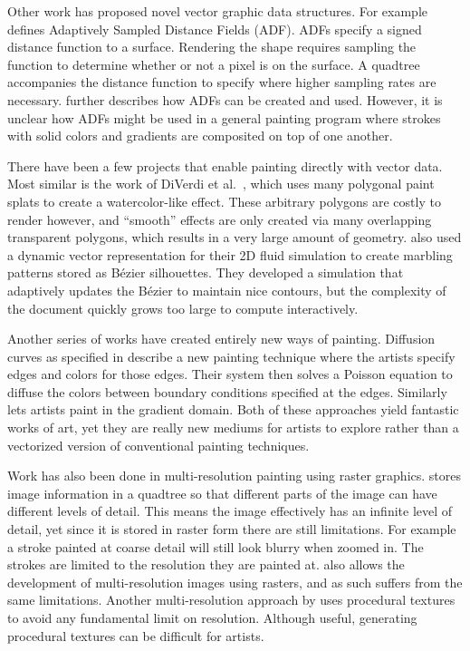 \documentclass[review]{acmsiggraph}
\begin{document}
Other work has proposed novel vector graphic data structures. For example \cite{Frisken:2000:ASD:344779.344899}
defines Adaptively Sampled Distance Fields (ADF). ADFs specify a signed distance function to a surface.
Rendering the shape requires sampling the function to determine whether or not a pixel is on the surface.
A quadtree accompanies the distance function to specify where higher sampling rates are necessary. \cite{Bremer:2001:VCM}
further describes how ADFs can be created and used. However, it is unclear how ADFs might be used in a general
painting program where strokes with solid colors and gradients are composited on top of one another.

There have been a few projects that enable painting directly with vector data.  Most similar is the work of DiVerdi et al.~, which uses many polygonal paint splats to create a watercolor-like effect.  These arbitrary polygons are costly to render however, and ``smooth'' effects are only created via many overlapping transparent polygons, which results in a very large amount of geometry.  \cite{ando2010} also used a dynamic vector representation for their 2D fluid simulation to create marbling patterns stored as B\'{e}zier silhouettes.  They developed a simulation that adaptively updates the B\'{e}zier to maintain nice contours, but the complexity of the document quickly grows too large to compute interactively.

Another series of works have created entirely new ways of painting. Diffusion curves as specified in \cite{Orzan:2008:DCV:1360612.1360691}
describe a new painting technique where the artists specify edges and colors for those edges. Their system
then solves a Poisson equation to diffuse the colors between boundary conditions specified at the edges.
Similarly \cite{McCann:2008:RGP:1360612.1360692}
lets artists paint in the gradient domain. Both of these approaches yield fantastic works of art, yet
they are really new mediums for artists to explore rather than a vectorized version of conventional
painting techniques.

Work has also been done in multi-resolution painting using raster graphics. \cite{Berman:1994:MPC:192161.192181}
stores image information in a quadtree so that different parts of the image can have different levels of detail.
This means the image effectively has an infinite level of detail, yet since it is stored in raster form
there are still limitations. For example a stroke painted at coarse detail will still look blurry when
zoomed in. The strokes are limited to the resolution they are painted at. \cite{Carr:2004:PD:1186562.1015809}
also allows the development of multi-resolution images using rasters, and as such suffers from the
same limitations. Another multi-resolution approach by \cite{Perlin:1995:LPP:218380.218437} uses
procedural textures to avoid any fundamental limit on resolution. Although useful,
generating procedural textures can be difficult for artists.
\end{document}
